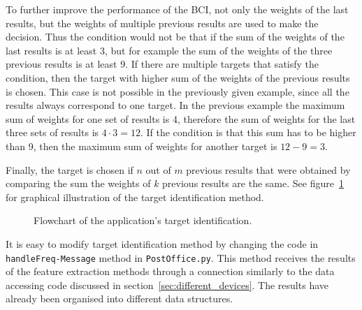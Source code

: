 To further improve the performance of the \gls{BCI}, not only the weights of the last results, but the weights of multiple previous results are used to make the decision. Thus the condition would not be that if the sum of the weights of the last results is at least 3, but for example the sum of the weights of the three previous results is at least 9. If there are multiple \glspl{target} that satisfy the condition, then the \gls{target} with higher sum of the weights of the previous results is chosen. This case is not possible in the previously given example, since all the results always correspond to one \gls{target}. In the previous example the maximum sum of weights for one set of results is 4, therefore the sum of weights for the last three sets of results is $4\cdot 3=12$. If the condition is that this sum has to be higher than 9, then the maximum sum of weights for another \gls{target} is $12-9=3$.

Finally, the \gls{target} is chosen if $n$ out of $m$ previous results that were obtained by comparing the sum the weights of $k$ previous results are the same. See figure~\ref{fig:target_identification} for graphical illustration of the \gls{target} identification method.

\begin{figure}[h!]
	\centering
	
	\caption{Flowchart of the application's target identification.}
	\label{fig:target_identification}
\end{figure}



It is easy to modify \gls{target} identification method by changing the code in \texttt{handleFreq-\break Message} method in \texttt{PostOffice.py}. This method receives the results of the \gls{feature extraction} methods through a connection similarly to the data accessing code discussed in section~\ref{sec:different_devices}. The results have already been organised into different data structures. %

